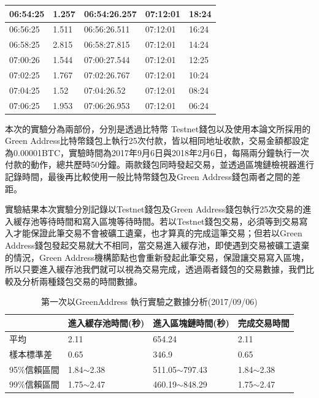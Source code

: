 \begin{table}[htbp]
\begin{tabular}{|l|l|l|l|l|}
			06:54:25 & 1.257 & 06:54:26.257 & 07:12:01 & 18:24 \\ \hline
			06:56:25 & 1.511 & 06:56:26.511 & 07:12:01 & 16:24 \\ \hline
			06:58:25 & 2.815 & 06:58:27.815 & 07:12:01 & 14:24 \\ \hline
			07:00:26 & 1.544 & 07:00:27.544 & 07:12:01 & 12:25 \\ \hline
			07:02:25 & 1.767 & 07:02:26.767 & 07:12:01 & 10:24 \\ \hline
			07:04:25 & 1.52 & 07:04:26.52 & 07:12:01 & 08:24 \\ \hline
			07:06:25 & 1.953 & 07:06:26.953 & 07:12:01 & 06:24 \\ \hline
			\end{tabular}
			\end{table}


		本次的實驗分為兩部份，分別是透過比特幣 Testnet錢包以及使用本論文所採用的Green Address比特幣錢包上執行25次付款，皆以相同地址收款，交易金額都設定為0.00001BTC，實驗時間為2017年9月6日與2018年2月6日，每隔兩分鐘執行一次付款的動作，總共歷時50分鐘。兩款錢包同時發起交易，並透過區塊鏈檢視器進行記錄時間，最後再比較使用一般比特幣錢包及Green Address錢包兩者之間的差距。

		
		實驗結果本次實驗分別記錄以Testnet錢包及Green Address錢包執行25次交易的進入緩存池等待時間和寫入區塊等待時間。若以Testnet錢包交易，必須等到交易寫入才能保證此筆交易不會被礦工遺棄，也才算真的完成這筆交易；但若以Green Address錢包發起交易就大不相同，當交易進入緩存池，即使遇到交易被礦工遺棄的情況，Green Address機構節點也會重新發起此筆交易，保證讓交易寫入區塊，所以只要進入緩存池我們就可以視為交易完成，透過兩者錢包的交易數據，我們比較及分析兩種錢包交易的時間數據。



				
				\begin{table}[htbp]
				\centering
				\caption{第一次以GreenAddress 執行實驗之數據分析(2017/09/06)}
				\label{1green}
				\begin{tabular}{|l|l|l|l|}
				\hline
				 & 進入緩存池時間(秒) & 進入區塊鏈時間(秒) & 完成交易時間 \\ \hline
				平均 & 2.11 & 654.24 & 2.11 \\ \hline
				樣本標準差 & 0.65 & 346.9 & 0.65 \\ \hline
				95\%信賴區間 & 1.84$\sim$2.38 & 511.05$\sim$797.43 & 1.84$\sim$2.38 \\ \hline
				99\%信賴區間 & 1.75$\sim$2.47 & 460.19$\sim$848.29 & 1.75$\sim$2.47 \\ \hline
				\end{tabular}
				\end{table}

